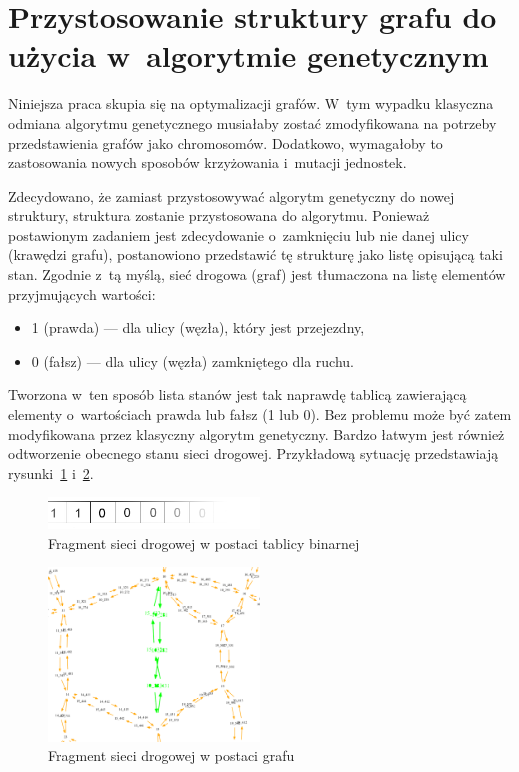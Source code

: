 \documentclass[twoside,12pt]{report}
\begin{document}
\section{Przystosowanie struktury grafu do użycia w~algorytmie genetycznym}\label{rozdz.przystosowanie}

Niniejsza praca skupia się na optymalizacji grafów. W~tym wypadku klasyczna odmiana algorytmu genetycznego musiałaby zostać zmodyfikowana na potrzeby przedstawienia grafów jako chromosomów. Dodatkowo, wymagałoby to zastosowania nowych sposobów krzyżowania i~mutacji jednostek. 

Zdecydowano, że zamiast przystosowywać algorytm genetyczny do nowej struktury, struktura zostanie przystosowana do algorytmu. Ponieważ postawionym zadaniem jest zdecydowanie o~zamknięciu lub nie danej ulicy (krawędzi grafu), postanowiono przedstawić tę strukturę jako listę opisującą taki stan. Zgodnie z~tą myślą, sieć drogowa (graf) jest tłumaczona na listę elementów przyjmujących wartości:

\begin{itemize}
\item 1 (prawda) --- dla ulicy (węzła), który jest przejezdny,
\item 0 (fałsz) --- dla ulicy (węzła) zamkniętego dla ruchu.
\end{itemize}

Tworzona w~ten sposób lista stanów jest tak naprawdę tablicą zawierającą elementy o~wartościach prawda lub fałsz (1 lub 0). Bez problemu może być zatem modyfikowana przez klasyczny algorytm genetyczny. Bardzo łatwym jest również odtworzenie obecnego stanu sieci drogowej. Przykładową sytuację przedstawiają rysunki~\ref{fig:bool_network_example} i~\ref{fig:graph_network_example}.

\begin{figure}[htbp]
	\centering
	\includegraphics[width=0.5\textwidth]{img/bool}
	\caption{Fragment sieci drogowej w postaci tablicy binarnej }
	\label{fig:bool_network_example}
\end{figure}
\begin{figure}[htbp]
	\centering
	\includegraphics[width=0.5\textwidth]{img/bool-efect}
	\caption{Fragment sieci drogowej w postaci grafu}
	\label{fig:graph_network_example}
\end{figure}
\end{document}

